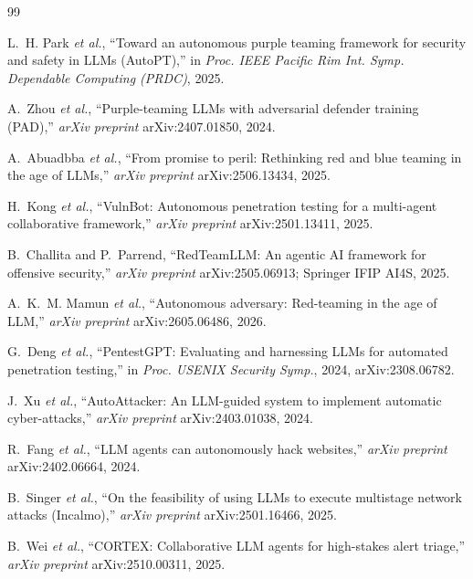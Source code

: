 \clearpage
{}
{}
\begin{singlespace}
\begin{thebibliography}{99}
\setlength{\itemsep}{6pt}

L.~H. Park \emph{et al.}, ``Toward an autonomous purple teaming framework for
security and safety in LLMs (AutoPT),'' in \emph{Proc. IEEE Pacific Rim Int.
Symp. Dependable Computing (PRDC)}, 2025.

A.~Zhou \emph{et al.}, ``Purple-teaming LLMs with adversarial defender training
(PAD),'' \emph{arXiv preprint} arXiv:2407.01850, 2024.

A.~Abuadbba \emph{et al.}, ``From promise to peril: Rethinking red and blue
teaming in the age of LLMs,'' \emph{arXiv preprint} arXiv:2506.13434, 2025.

H.~Kong \emph{et al.}, ``VulnBot: Autonomous penetration testing for a
multi-agent collaborative framework,'' \emph{arXiv preprint} arXiv:2501.13411,
2025.

B.~Challita and P.~Parrend, ``RedTeamLLM: An agentic AI framework for offensive
security,'' \emph{arXiv preprint} arXiv:2505.06913; Springer IFIP AI4S, 2025.

A.~K.~M. Mamun \emph{et al.}, ``Autonomous adversary: Red-teaming in the age of
LLM,'' \emph{arXiv preprint} arXiv:2605.06486, 2026.

G.~Deng \emph{et al.}, ``PentestGPT: Evaluating and harnessing LLMs for automated
penetration testing,'' in \emph{Proc. USENIX Security Symp.}, 2024,
arXiv:2308.06782.

J.~Xu \emph{et al.}, ``AutoAttacker: An LLM-guided system to implement automatic
cyber-attacks,'' \emph{arXiv preprint} arXiv:2403.01038, 2024.

R.~Fang \emph{et al.}, ``LLM agents can autonomously hack websites,''
\emph{arXiv preprint} arXiv:2402.06664, 2024.

B.~Singer \emph{et al.}, ``On the feasibility of using LLMs to execute
multistage network attacks (Incalmo),'' \emph{arXiv preprint} arXiv:2501.16466,
2025.

B.~Wei \emph{et al.}, ``CORTEX: Collaborative LLM agents for high-stakes alert
triage,'' \emph{arXiv preprint} arXiv:2510.00311, 2025.


\end{thebibliography}
\end{singlespace}
